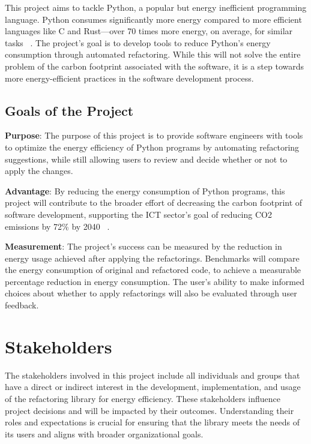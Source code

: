 \documentclass[12pt]{article}
\begin{document}
This project aims to tackle Python, a popular but energy inefficient programming language. Python consumes significantly more energy compared to more efficient languages like C and Rust—over 70 times more energy, on average, for similar tasks ~\citep{PereiraEtAl2017}. The project's goal is to develop tools to reduce Python's energy consumption through automated refactoring. While this will not solve the entire problem of the carbon footprint associated with the software, it is a step towards more energy-efficient practices in the software development process.

\subsection{Goals of the Project}
\noindent \textbf{Purpose}: The purpose of this project is to provide software engineers with tools to optimize the energy efficiency of Python programs by automating refactoring suggestions, while still allowing users to review and decide whether or not to apply the changes.

\noindent \textbf{Advantage}: By reducing the energy consumption of Python programs, this project will contribute to the broader effort of decreasing the carbon footprint of software development, supporting the ICT sector's goal of reducing CO2 emissions by 72\% by 2040 ~\citep{FreitagAndBernersLee2021}.

\noindent \textbf{Measurement}: The project's success can be measured by the reduction in energy usage 
achieved after applying the refactorings. Benchmarks will compare the energy consumption of original 
and refactored code, to achieve a measurable percentage reduction in energy consumption. The user's 
ability to make informed choices about whether to apply refactorings will also be evaluated through 
user feedback.

\section{Stakeholders}

The stakeholders involved in this project include all individuals and groups that have a direct or indirect interest in the development, implementation, and usage of the refactoring library for energy efficiency. These stakeholders influence project decisions and will be impacted by their outcomes. Understanding their roles and expectations is crucial for ensuring that the library meets the needs of its users and aligns with broader organizational goals.\\
\end{document}
